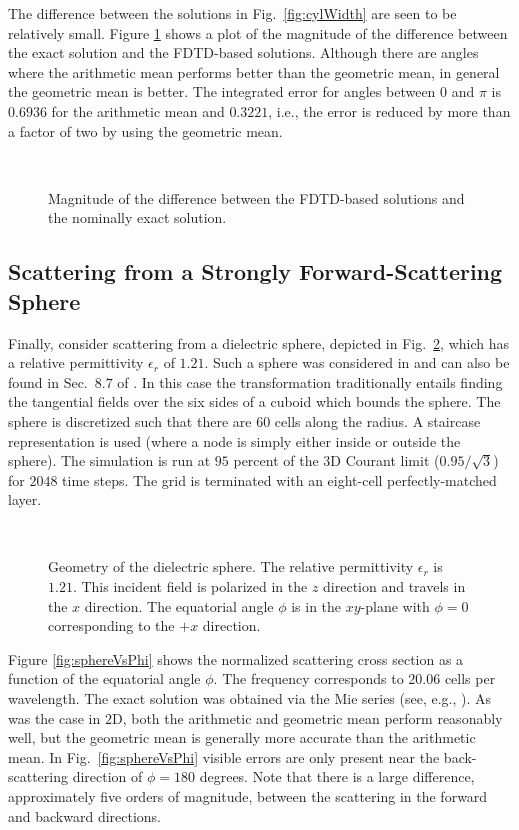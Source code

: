 The difference between the solutions in Fig.\ \ref{fig:cylWidth} are
seen to be relatively small.  Figure \ref{fig:cylErr} shows a plot of
the magnitude of the difference between the exact solution and the 
FDTD-based solutions.  Although there are angles where the arithmetic
mean performs better than the geometric mean, in general the geometric
mean is better.  The integrated error for angles between $0$ and
$\pi$ is $0.6936$ for the arithmetic mean and $0.3221$, i.e., the
error is reduced by more than a factor of two by using the geometric
mean.  
\begin{figure}
\centering
{}\\
\caption{Magnitude of the difference between the FDTD-based solutions
and the nominally exact solution.}
\label{fig:cylErr}
\end{figure}

\subsection{Scattering from a Strongly Forward-Scattering Sphere}

Finally, consider scattering from a dielectric sphere, depicted in
Fig.\ \ref{fig:sphereGeom}, which has a relative permittivity
$\epsilon_r$ of $1.21$.  Such a sphere was considered in
\cite{li2005a2} and can also be found in Sec.\ $8.7$ of
\cite{taflove2005b}.  In this case the transformation traditionally
entails finding the tangential fields over the six sides of a cuboid
which bounds the sphere.  The sphere is discretized such that there
are $60$ cells along the radius.  A staircase representation is used
(where a node is simply either inside or outside the sphere).  The
simulation is run at $95$ percent of the $3$D Courant limit
($0.95/\sqrt{3}$) for $2048$ time steps.  The grid is terminated with
an eight-cell perfectly-matched layer.
\begin{figure}
\centering
{}\\
\caption{Geometry of the dielectric sphere.  The relative permittivity
$\epsilon_r$ is $1.21$.  This incident field is polarized in the $z$
direction and travels in the $x$ direction.  The equatorial angle
$\phi$ is in the $xy$-plane with $\phi=0$ corresponding to the $+x$
direction.}
\label{fig:sphereGeom}
\end{figure}

Figure \ref{fig:sphereVsPhi} shows the normalized scattering cross
section as a function of the equatorial angle $\phi$.  The frequency
corresponds to $20.06$ cells per wavelength.  The exact solution was
obtained via the Mie series (see, e.g., \cite{ishimaru1991b}).  As was
the case in $2$D, both the arithmetic and geometric mean perform
reasonably well, but the geometric mean is generally more accurate
than the arithmetic mean.  In Fig.\ \ref{fig:sphereVsPhi} visible
errors are only present near the back-scattering direction of
$\phi=180$ degrees.  Note that there is a large difference,
approximately five orders of magnitude, between the scattering in the
forward and backward directions.  

